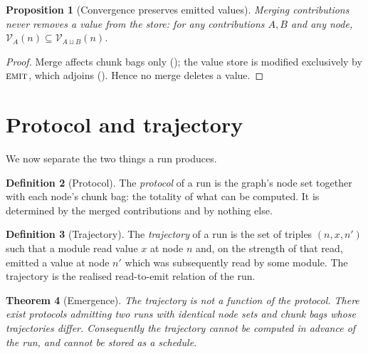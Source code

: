 \documentclass[11pt,a4paper]{article}
\theoremstyle{thmstyle}
\newtheorem{theorem}{Theorem}[section]
\newtheorem{proposition}[theorem]{Proposition}
\theoremstyle{definition}
\newtheorem{definition}[theorem]{Definition}
\theoremstyle{remark}
\newcommand{\Node}{n}
\newcommand{\Vals}{\mathcal{V}}
\newcommand{\emit}{\textsc{emit}}
\begin{document}
\begin{proposition}[Convergence preserves emitted values]
\label{prop:convergence-values}
Merging contributions never removes a value from the store: for any
contributions $A,B$ and any node,
$\Vals_{A}(\Node)\subseteq\Vals_{A\sqcup B}(\Node)$.
\end{proposition}

\begin{proof}
Merge affects chunk bags only (); the value store is
modified exclusively by $\emit$, which adjoins (). Hence no
merge deletes a value.
\end{proof}

\section{Protocol and trajectory}
\label{sec:trajectory}

We now separate the two things a run produces.

\begin{definition}[Protocol]
\label{def:protocol}
The \emph{protocol} of a run is the graph's node set together with each
node's chunk bag: the totality of what can be computed. It is determined by
the merged contributions and by nothing else.
\end{definition}

\begin{definition}[Trajectory]
\label{def:trajectory}
The \emph{trajectory} of a run is the set of triples
$(\Node,x,\Node')$ such that a module read value $x$ at node $\Node$ and, on
the strength of that read, emitted a value at node $\Node'$ which was
subsequently read by some module. The trajectory is the realised
read-to-emit relation of the run.
\end{definition}

\begin{theorem}[Emergence]
\label{thm:emergence}
The trajectory is not a function of the protocol. There exist protocols
admitting two runs with identical node sets and chunk bags whose
trajectories differ. Consequently the trajectory cannot be computed in
advance of the run, and cannot be stored as a schedule.
\end{theorem}
\end{document}
